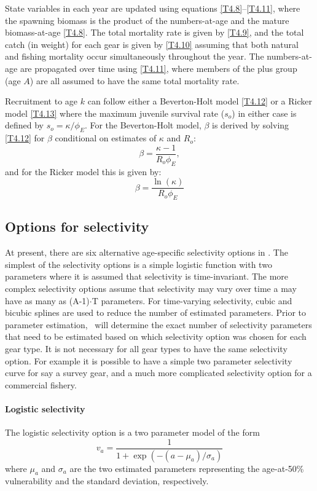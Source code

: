 State variables in each year are updated using equations \ref{T4.8}--\ref{T4.11}, where the spawning biomass is the product of the numbers-at-age and the mature biomass-at-age \eqref{T4.8}.  The total mortality rate is given by \eqref{T4.9}, and the total catch (in weight) for each gear is given by \eqref{T4.10} assuming that both natural and fishing mortality occur simultaneously throughout the year.  The numbers-at-age are propagated over time using \eqref{T4.11}, where members of the plus group (age $A$) are all assumed to have the same total mortality rate.  

Recruitment to age $k$ can follow either a Beverton-Holt model \eqref{T4.12} or a Ricker model \eqref{T4.13} where the maximum juvenile survival rate ($s_o$) in either case is defined by $s_o=\kappa/\phi_E$.  For the Beverton-Holt model, $\beta$ is derived by solving \eqref{T4.12} for $\beta$ conditional on estimates of $\kappa$ and $R_o$:
\[
\beta = \frac{\kappa-1}{R_o \phi_E},
\]
and for the Ricker model this is given by:
\[
\beta = \frac{\ln(\kappa)}{R_o \phi_E}
\]


		
\subsection{Options for selectivity}
		
At present, there are six alternative age-specific selectivity options in \iscam.  The simplest of the selectivity options is a simple logistic function with two parameters where it is assumed that selectivity is time-invariant.  The more complex selectivity options assume that selectivity may vary over time a may have as many as (A-1)$\cdot$T parameters.  For time-varying selectivity, cubic and bicubic splines are used to reduce the number of estimated parameters.  Prior to parameter estimation, \iscam\ will determine the exact number of selectivity parameters that need to be estimated based on which selectivity option was chosen for each gear type.  It is not necessary for all gear types to have the same selectivity option.  For example it is possible to have a simple two parameter selectivity curve for say a survey gear, and a much more complicated selectivity option for a commercial fishery.

\paragraph{Logistic selectivity} 
The logistic selectivity option is a two parameter model of the form
\[
v_a = \frac{1}{1+ \exp{(-(a-\mu_{a})/\sigma_a)}}
\]
where $\mu_a$ and $\sigma_a$ are the two estimated parameters representing the age-at-50\% vulnerability and the standard deviation, respectively.

